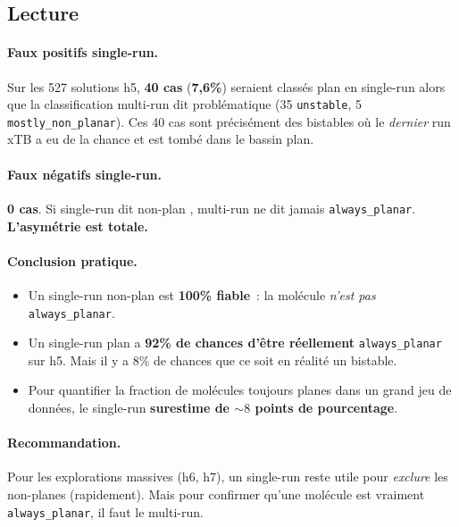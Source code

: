 \documentclass[11pt,a4paper]{article}
\begin{document}
\subsection{Lecture}

\paragraph{Faux positifs single-run.}
Sur les 527 solutions h5, \textbf{40 cas} (\textbf{7,6\%}) seraient classés \og plan \fg{} en single-run alors que la classification multi-run dit \og problématique \fg{} (35 \texttt{unstable}, 5 \texttt{mostly\_non\_planar}). Ces 40 cas sont précisément des bistables où le \emph{dernier} run xTB a eu de la chance et est tombé dans le bassin plan.

\paragraph{Faux négatifs single-run.}
\textbf{0 cas}. Si single-run dit \og non-plan \fg{}, multi-run ne dit jamais \texttt{always\_planar}. \textbf{L'asymétrie est totale.}

\paragraph{Conclusion pratique.}
\begin{itemize}[leftmargin=2em,itemsep=0.2em]
  \item Un single-run \og non-plan \fg{} est \textbf{100\% fiable}~: la molécule \emph{n'est pas} \texttt{always\_planar}.
  \item Un single-run \og plan \fg{} a \textbf{92\% de chances d'être réellement} \texttt{always\_planar} sur h5. Mais il y a 8\% de chances que ce soit en réalité un bistable.
  \item Pour quantifier la fraction de molécules \og toujours planes \fg{} dans un grand jeu de données, le single-run \textbf{surestime de ${\sim}8$ points de pourcentage}.
\end{itemize}

\paragraph{Recommandation.}
Pour les explorations massives (h6, h7), un single-run reste utile pour \emph{exclure} les non-planes (rapidement). Mais pour confirmer qu'une molécule est vraiment \texttt{always\_planar}, il faut le multi-run.

\end{document}

